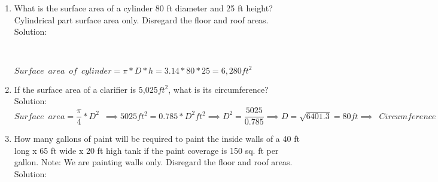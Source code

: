 \begin{enumerate}
\item What is the surface area of a cylinder 80 ft diameter and 25 ft height?  Cylindrical part surface area only. Disregard the floor and roof areas.\\
Solution:\\
\begin{center}
\\
\end{center}
$Surface \enspace area \enspace of \enspace cylinder=\pi*D*h=3.14*80*25=\boxed{6,280ft^2}$

\item If the surface area of a clarifier is 5,025$ft^2$, what is its circumference?\\
Solution:\\
$Surface \enspace area=\dfrac{\pi}{4}*D^2 \enspace \implies 5025ft^2=0.785*D^2 ft^2\implies D^2=\dfrac{5025}{0.785} \implies D=\sqrt{6401.3}=80ft \implies \enspace Circumference=\pi*D=3.14*80ft=\boxed{251ft}$

\item How many gallons of paint will be required to paint the inside walls of a 40 ft long x 65 ft wide x 20 ft high tank if the paint coverage is 150 sq. ft per gallon.  Note:  We are painting walls only.  Disregard the floor and roof areas.\\
Solution:\\
\begin{center}
\begin{tikzpicture}
      

\end{tikzpicture}
\end{center}
\end{enumerate}
